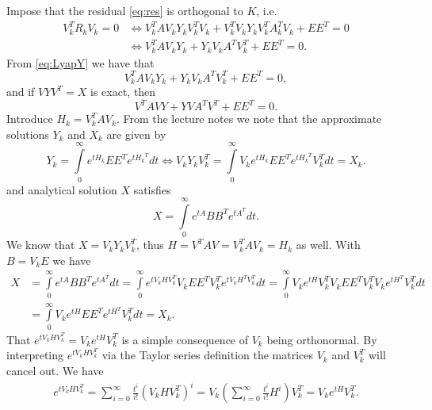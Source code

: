 Impose that the residual \eqref{eq:res} is orthogonal to $K$, i.e.
\begin{align}
  V_{k}^{T}R_{k}V_{k} = 0 &\Leftrightarrow V_{k}^{T}AV_{k}Y_{k}V_{k}^{T}V_{k}+V_{k}^{T}V_{k}Y_{k}V_{k}^{T}A_{k}^{T}V_{k} + EE^{T} = 0\\
  \label{eq:LyapY}
   &\Leftrightarrow V_{k}^{T}AV_{k}Y_{k}+Y_{k}V_{k}A^{T}V_{k}^{T} + EE^{T} = 0.
\end{align}
From \eqref{eq:LyapY} we have that
\begin{equation*}
V_{k}^{T}AV_{k}Y_{k}+Y_{k}V_{k}A^{T}V_{k}^{T} + EE^{T} = 0,
\end{equation*}
and if $VYV^{T} = X$ is exact, then
\begin{equation*}
V^{T}AVY+YVA^{T}V^{T} + EE^{T} = 0.
\end{equation*}
Introduce $H_{k} = V_{k}^{T}AV_{k}$. From the lecture notes we note that the approximate solutions $Y_{k}$ and
$X_{k}$ are given by
\begin{equation*}
Y_{k} =  \int\limits_{0}^{\infty}e^{tH_{k}}EE^{T}e^{{tH_{k}}^{T}}dt \Leftrightarrow V_{k}Y_{k}V_{k}^{T} =  \int\limits_{0}^{\infty}V_{k}e^{tH_{k}}EE^{T}e^{{tH_{k}}^{T}}V_{k}^{T}dt = X_{k}.
\end{equation*}
and analytical solution $X$ satisfies
\begin{equation*}
X =  \int\limits_{0}^{\infty}e^{tA}BB^{T}e^{{tA}^{T}}dt.
\end{equation*}
We know that $X = V_{k}Y_{k}V_{k}^{T}$, thus $H = V^{T}AV=V_{k}^{T}AV_{k} = H_{k}$ as well. With $B = V_{k}E$ we have
\begin{align*}
X &=  \int\limits_{0}^{\infty}e^{tA}BB^{T}e^{{tA}^{T}}dt =
\int\limits_{0}^{\infty}e^{tV_{k}HV_{k}^{T}}V_{k}EE^{T}V_{k}^{T}e^{tV_{k}H^{T}V_{k}^{T}}dt = \int\limits_{0}^{\infty}V_{k}e^{tH}V_{k}^{T}V_{k}EE^{T}V_{k}^{T}V_{k}e^{{tH}^{T}}V_{k}^{T}dt\\
&=\int\limits_{0}^{\infty}V_{k}e^{tH}EE^{T}e^{{tH}^{T}}V_{k}^{T}dt = X_{k}.
\end{align*}
That $e^{tV_{k}HV_{k}^{T}} = V_{k}e^{tH}V_{k}^{T}$ is a simple consequence of $V_{k}$ being orthonormal. By interpreting $e^{tV_{k}HV_{k}^{T}}$ via the Taylor series definition the matrices  $V_{k}$ and $V_{k}^{T}$ will cancel out. We have
\begin{align*}
  e^{tV_{k}HV_{k}^{T}} = \sum\limits_{i = 0}^{\infty}\frac{t^{i}}{i!}(V_{k}HV_{k}^{T})^{i}=V_{k}\left(\sum\limits_{i = 0}^{\infty}\frac{t^{i}}{i!}H^{i}\right)V_{k}^{T} = V_{k}e^{tH}V_{k}^{T}.
\end{align*}


